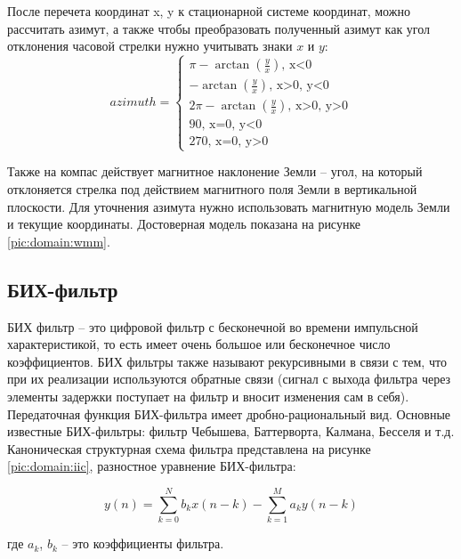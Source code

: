 После перечета координат x, y к \cite{accelerometer} стационарной системе координат, можно рассчитать азимут, 
а также чтобы преобразовать полученный азимут как угол отклонения часовой стрелки нужно 
учитывать знаки $x$ и $y$:
\begin{equation}
    azimuth =
    \begin{cases}
      \pi - \arctan\left(\frac{y}{x}\right) \text{, x<0}\\      
      - \arctan\left(\frac{y}{x}\right) \text{, x>0, y<0} \\
      2\pi - \arctan\left(\frac{y}{x}\right) \text{, x>0, y>0} \\
      90 \text{, x=0, y<0} \\
      270 \text{, x=0, y>0}
    \end{cases}
\end{equation}

Также на компас действует магнитное наклонение Земли -- угол, на который отклоняется стрелка под действием 
магнитного поля Земли в вертикальной плоскости. Для уточнения азимута нужно использовать магнитную модель Земли
и текущие координаты.
Достоверная модель показана на рисунке \ref{pic:domain:wmm}.

\subsection{БИХ-фильтр}
БИХ фильтр  -- это цифровой фильтр с
бесконечной во времени импульсной характеристикой, 
то есть имеет очень большое или бесконечное число коэффициентов. БИХ фильтры также 
называют рекурсивными в связи с тем, что при их
реализации используются обратные связи (сигнал с выхода фильтра через элементы задержки 
поступает на фильтр и вносит изменения сам в себя). 
Передаточная функция БИХ-фильтра имеет дробно-рациональный вид. Основные известные БИХ-фильтры: 
фильтр Чебышева, Баттерворта, Калмана, Бесселя и т.д.
Каноническая структурная схема фильтра представлена на рисунке \ref{pic:domain:iic}, разностное уравнение БИХ-фильтра:

\begin{equation}
    \label{eq:domain:eqIIC}
    y(n) = \sum_{k=0}^{N}b_{k}x(n-k) - \sum_{k=1}^{M}a_{k}y(n-k)
    \end{equation}
    \begin{explanationx}
        \item[где] $a_{k}$, $b_{k}$  -- это коэффициенты фильтра.
      \end{explanationx} 

